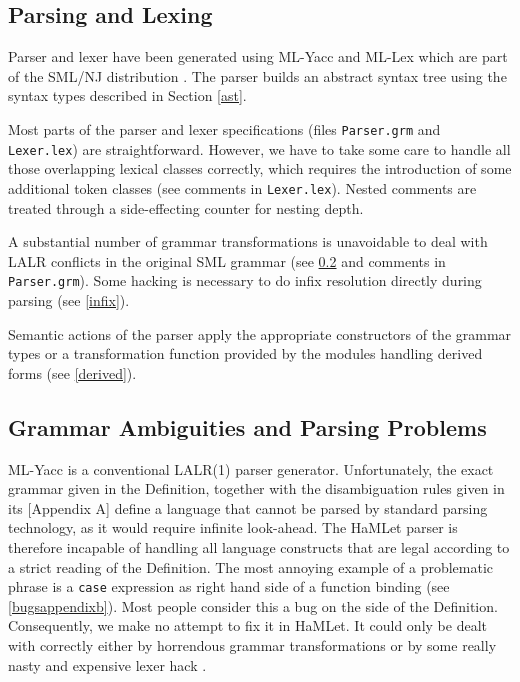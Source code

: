 \documentclass[twoside,titlepage]{article}
\begin{document}
\subsection{Parsing and Lexing}
\label{parser}

Parser and lexer have been generated using ML-Yacc \cite{mlyacc} and ML-Lex \cite{mllex} which are part of the SML/NJ distribution \cite{smlnj}. The parser builds an abstract syntax tree using the syntax types described in Section \ref{ast}.

Most parts of the parser and lexer specifications (files {\tt Parser.grm} and {\tt Lexer.lex}) are straightforward.
However, we have to take some care to handle all those overlapping lexical classes correctly, which requires the introduction of some additional token classes (see comments in {\tt Lexer.lex}). Nested comments are treated through a side-effecting counter for nesting depth.

A substantial number of grammar transformations is unavoidable to deal with LALR conflicts in the original SML grammar (see \ref{ambiguities} and comments in {\tt Parser.grm}). Some hacking is necessary to do infix resolution directly during parsing (see \ref{infix}).

Semantic actions of the parser apply the appropriate constructors of the grammar types or a transformation function provided by the modules handling derived forms (see \ref{derived}).



\subsection{Grammar Ambiguities and Parsing Problems}
\label{ambiguities}

ML-Yacc is a conventional LALR(1) parser generator. Unfortunately, the exact grammar given in the Definition, together with the disambiguation rules given in its [Appendix A] define a language that cannot be parsed by standard parsing technology, as it would require infinite look-ahead. The HaMLet parser is therefore incapable of handling all language constructs that are legal according to a strict reading of the Definition. The most annoying example of a problematic phrase is a {\tt case} expression as right hand side of a function binding (see \ref{bugsappendixb}). Most people consider this a bug on the side of the Definition. Consequently, we make no attempt to fix it in HaMLet. It could only be dealt with correctly either by horrendous grammar transformations or by some really nasty and expensive lexer hack \cite{mistakes}. 
\end{document}
